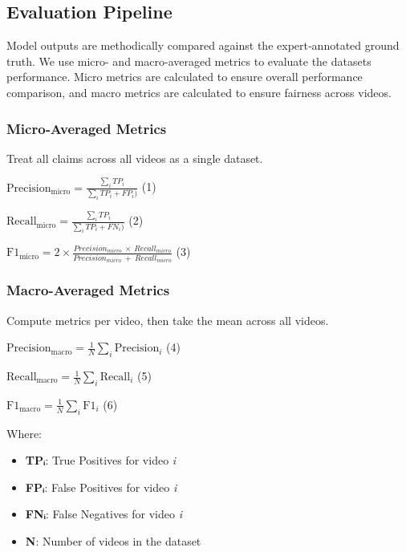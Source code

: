\documentclass[]{article}
\begin{document}
\subsection{Evaluation Pipeline}

Model outputs are methodically compared against the expert‑annotated
ground truth. We use micro- and macro-averaged metrics to evaluate the
dataset\textquotesingle s performance. Micro metrics are calculated to
ensure overall performance comparison, and macro metrics are calculated
to ensure fairness across videos.

\subsubsection{Micro‑Averaged Metrics}\label{microaveraged-metrics}

Treat all claims across all videos as a single dataset.

\(\text{Precision}_{\text{micro}} = \frac{\sum_{i}^{}TP_{i}}{\sum_{i}^{}TP_{i} + FP_{i})}\)
(1)

\(\text{Recall}_{\text{micro}} = \frac{\sum_{i}^{}TP_{i}}{\sum_{i}^{}TP_{i} + FN_{i})}\)
(2)

\(\text{F1}_{\text{micro}} = 2 \times \frac{{Precision}_{micro}\  \times {\ Recall}_{micro}}{{Precision}_{micro}\  + {\ Recall}_{micro}}\)
(3)

\subsubsection{Macro-Averaged Metrics}

Compute metrics per video, then take the mean across all videos.

\(\text{Precision}_{\text{macro}} = \frac{1}{N}\sum_{i}^{}\text{Precision}_{i}\)
(4)

\(\text{Recall}_{\text{macro}} = \frac{1}{N}\sum_{i}^{}\text{Recall}_{i}\)
(5)

\(\text{F1}_{\text{macro}} = \frac{1}{N}\sum_{i}^{}\text{F1}_{i}\) (6)

Where:

\begin{itemize}
\item
  \textbf{TPᵢ}: True Positives for video \emph{i}
\item
  \textbf{FPᵢ}: False Positives for video \emph{i}
\item
  \textbf{FNᵢ}: False Negatives for video \emph{i}
\item
  \textbf{N}: Number of videos in the dataset
\end{itemize}
\end{document}

